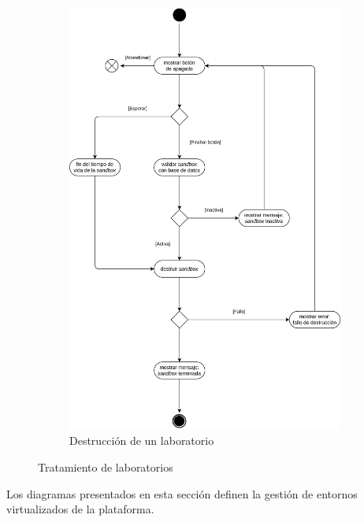 \begin{figure}[h]
                \hfill
                \begin{subfigure}{0.45\textwidth}
                    \centering
                    \includegraphics[scale=0.115]{images/Diagramas/Actividades y transiciones 5.png}
                    \caption{Destrucción de un laboratorio}
                    \label{fig:destruccion-laboratorio}
                \end{subfigure}
                \caption{Tratamiento de laboratorios}
                \label{fig:tratamiento-laboratorios}
            \end{figure}
            
            Los diagramas presentados en esta sección definen la gestión de entornos virtualizados de la plataforma.
            
